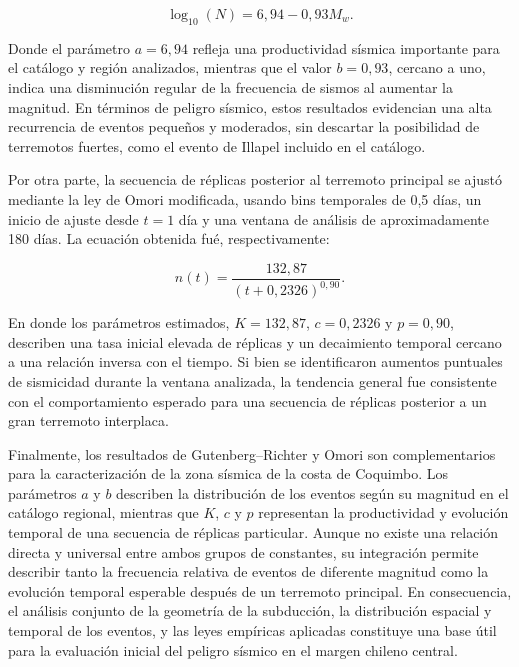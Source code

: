\documentclass[a4paper,12pt]{article} %
\numberwithin{equation}{section} %
\numberwithin{figure}{section} %
\begin{document}
\[
\log_{10}\left(N\right) = 6{,}94 - 0{,}93M_w.
\]

Donde el parámetro $a=6{,}94$ refleja una productividad sísmica importante para el catálogo y región analizados, mientras que el valor $b=0{,}93$, cercano a uno, indica una disminución regular de la frecuencia de sismos al aumentar la magnitud. En términos de peligro sísmico, estos resultados evidencian una alta recurrencia de eventos pequeños y moderados, sin descartar la posibilidad de terremotos fuertes, como el evento de Illapel incluido en el catálogo.

Por otra parte, la secuencia de réplicas posterior al terremoto principal se ajustó mediante la ley de Omori modificada, usando bins temporales de 0{,}5 días, un inicio de ajuste desde $t=1$ día y una ventana de análisis de aproximadamente 180 días. La ecuación obtenida fué, respectivamente:

\[
n(t) =
\frac{132{,}87}
{\left(t+0{,}2326\right)^{0{,}90}}.
\]

En donde los parámetros estimados, $K=132{,}87$, $c=0{,}2326$ y $p=0{,}90$, describen una tasa inicial elevada de réplicas y un decaimiento temporal cercano a una relación inversa con el tiempo. Si bien se identificaron aumentos puntuales de sismicidad durante la ventana analizada, la tendencia general fue consistente con el comportamiento esperado para una secuencia de réplicas posterior a un gran terremoto interplaca.

Finalmente, los resultados de Gutenberg--Richter y Omori son complementarios para la caracterización de la zona sísmica de la costa de Coquimbo. Los parámetros $a$ y $b$ describen la distribución de los eventos según su magnitud en el catálogo regional, mientras que $K$, $c$ y $p$ representan la productividad y evolución temporal de una secuencia de réplicas particular. Aunque no existe una relación directa y universal entre ambos grupos de constantes, su integración permite describir tanto la frecuencia relativa de eventos de diferente magnitud como la evolución temporal esperable después de un terremoto principal. En consecuencia, el análisis conjunto de la geometría de la subducción, la distribución espacial y temporal de los eventos, y las leyes empíricas aplicadas constituye una base útil para la evaluación inicial del peligro sísmico en el margen chileno central.
\newpage

\clearpage
\newpage


\end{document}
